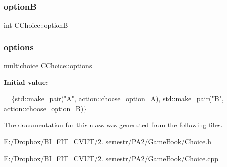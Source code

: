 \subsubsection{\texorpdfstring{optionB}{optionB}}
{\footnotesize\ttfamily int C\+Choice\+::optionB\hspace{0.3cm}{\ttfamily [protected]}}

\mbox{\label{class_c_choice_a80f4aa4ea3bb2ff9ae3f9e45fcc921ce}} 
\subsubsection{\texorpdfstring{options}{options}}
{\footnotesize\ttfamily \mbox{\hyperlink{_game_menus_8h_acdb545ed67596d0840e35ed209fecbe9}{multichoice}} C\+Choice\+::options\hspace{0.3cm}{\ttfamily [protected]}}

{\bfseries Initial value\+:}
\begin{DoxyCode}
= \{std::make\_pair(\textcolor{stringliteral}{"A"}, \mbox{\hyperlink{_actions_list_8h_a2f4ab7bf743142dae2e459aa18f9f1d4a1657f5e177f996c23e33e1fdbef1a8ce}{action::choose\_option\_A}}),
                           std::make\_pair(\textcolor{stringliteral}{"B"}, \mbox{\hyperlink{_actions_list_8h_a2f4ab7bf743142dae2e459aa18f9f1d4a09728f3dc698db847abe108d25825ff4}{action::choose\_option\_B}})\}
\end{DoxyCode}


The documentation for this class was generated from the following files\+:\begin{DoxyCompactItemize}
\item 
E\+:/\+Dropbox/\+B\+I\+\_\+\+F\+I\+T\+\_\+\+C\+V\+U\+T/2. semestr/\+P\+A2/\+Game\+Book/\mbox{\hyperlink{_choice_8h}{Choice.\+h}}\item 
E\+:/\+Dropbox/\+B\+I\+\_\+\+F\+I\+T\+\_\+\+C\+V\+U\+T/2. semestr/\+P\+A2/\+Game\+Book/\mbox{\hyperlink{_choice_8cpp}{Choice.\+cpp}}\end{DoxyCompactItemize}
